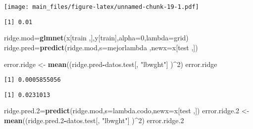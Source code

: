 \documentclass[]{article}
\newenvironment{Shaded}{\begin{snugshade}}{\end{snugshade}}
\newcommand{\KeywordTok}[1]{\textcolor[rgb]{0.13,0.29,0.53}{\textbf{#1}}}
\newcommand{\DataTypeTok}[1]{\textcolor[rgb]{0.13,0.29,0.53}{#1}}
\newcommand{\DecValTok}[1]{\textcolor[rgb]{0.00,0.00,0.81}{#1}}
\newcommand{\StringTok}[1]{\textcolor[rgb]{0.31,0.60,0.02}{#1}}
\newcommand{\CommentTok}[1]{\textcolor[rgb]{0.56,0.35,0.01}{\textit{#1}}}
\newcommand{\OperatorTok}[1]{\textcolor[rgb]{0.81,0.36,0.00}{\textbf{#1}}}
\newcommand{\NormalTok}[1]{#1}
\begin{document}
\texttt{[image: main\_files/figure-latex/unnamed-chunk-19-1.pdf]}

\begin{Shaded}
\end{Shaded}

\begin{verbatim}
[1] 0.01
\end{verbatim}

\begin{Shaded}
\begin{Highlighting}[]
\NormalTok{ridge.mod=}\KeywordTok{glmnet}\NormalTok{(x[train ,],y[train],}\DataTypeTok{alpha=}\DecValTok{0}\NormalTok{,}\DataTypeTok{lambda=}\NormalTok{grid)}
\NormalTok{ridge.pred=}\KeywordTok{predict}\NormalTok{(ridge.mod,}\DataTypeTok{s=}\NormalTok{mejorlambda ,}\DataTypeTok{newx=}\NormalTok{x[test ,])}

\NormalTok{error.ridge <-}\StringTok{ }\KeywordTok{mean}\NormalTok{((ridge.pred}\OperatorTok{-}\NormalTok{datos.test[, }\StringTok{"lbwght"}\NormalTok{] )}\OperatorTok{^}\DecValTok{2}\NormalTok{)}
\NormalTok{error.ridge}
\end{Highlighting}
\end{Shaded}

\begin{verbatim}
[1] 0.0005855056
\end{verbatim}

\begin{Shaded}
\end{Shaded}

\begin{verbatim}
[1] 0.0231013
\end{verbatim}

\begin{Shaded}
\begin{Highlighting}[]
\NormalTok{ridge.pred.}\DecValTok{2}\NormalTok{=}\KeywordTok{predict}\NormalTok{(ridge.mod,}\DataTypeTok{s=}\NormalTok{lambda.codo,}\DataTypeTok{newx=}\NormalTok{x[test ,])}
\NormalTok{error.ridge.}\DecValTok{2}\NormalTok{ <-}\StringTok{ }\KeywordTok{mean}\NormalTok{((ridge.pred.}\DecValTok{2}\OperatorTok{-}\NormalTok{datos.test[, }\StringTok{"lbwght"}\NormalTok{] )}\OperatorTok{^}\DecValTok{2}\NormalTok{)}
\NormalTok{error.ridge.}\DecValTok{2}
\end{Highlighting}
\end{Shaded}
\end{document}

